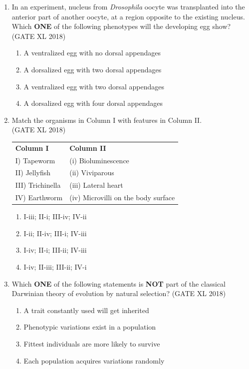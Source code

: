 \documentclass[14pt]{extarticle}
\begin{document}
\begin{flushleft}
\begin{enumerate}
    \item In an experiment, nucleus from  \textit{Drosophila} oocyte  was transplanted into the anterior part of another oocyte, at a region opposite to the existing nucleus. Which \textbf{ONE} of the 
    following phenotypes will the developing egg show?\\  \hfill(GATE XL 2018)\\
    \begin{enumerate}[label=(\Alph*)]
        \item A ventralized egg with no dorsal appendages
        \item A dorsalized egg with two dorsal appendages
        \item A ventralized egg with two dorsal appendages
        \item A dorsalized egg with four dorsal appendages
    \end{enumerate}

    \item Match the organisms in Column I with features in Column II.\\ 
    \hfill(GATE XL 2018)\\
\begin{tabular}{p{6cm} p{6cm}}
\textbf{Column I} & \textbf{Column II} \\
I) Tapeworm & (i) Bioluminescence \\
II) Jellyfish & (ii) Viviparous \\
III) Trichinella & (iii) Lateral heart \\
IV) Earthworm & (iv) Microvilli on the body surface \\
\end{tabular}
    \begin{multicols}{2}
    \begin{enumerate}[label=(\Alph*)]
        \item I-iii; II-i; III-iv; IV-ii
        \item I-ii; II-iv; III-i; IV-iii
        \item I-iv; II-i; III-ii; IV-iii
        \item I-iv; II-iii; III-ii; IV-i
    \end{enumerate}
    \end{multicols}

    \item Which \textbf{ONE} of the following statements is \textbf{NOT} part of the classical Darwinian theory of evolution by natural selection? \hfill(GATE XL 2018)\\
    \begin{enumerate}[label=(\Alph*)]
        \item A trait constantly used will get inherited
        \item Phenotypic variations exist in a population
        \item Fittest individuals are more likely to survive
        \item Each population acquires variations randomly
    \end{enumerate}


\end{enumerate}
\end{flushleft}
\end{document}
